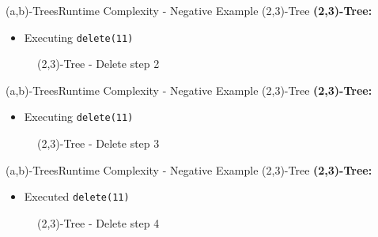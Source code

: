 
\begin{frame}{(a,b)-Trees}{Runtime Complexity - Negative Example (2,3)-Tree}
  \textbf{(2,3)-Tree:}
  \begin{itemize}
    \item
      Executing \texttt{\color{Mittel-Blau}delete(11)}
  \end{itemize}
  \begin{figure}
    \begin{adjustbox}{width=0.6\linewidth}
      
    \end{adjustbox}
    \label{fig:a_b_tree:2_3_tree_3}
    \caption{(2,3)-Tree - Delete step 2}
  \end{figure}
\end{frame}


\begin{frame}{(a,b)-Trees}{Runtime Complexity - Negative Example (2,3)-Tree}
  \textbf{(2,3)-Tree:}
  \begin{itemize}
    \item
      Executing \texttt{\color{Mittel-Blau}delete(11)}
  \end{itemize}
  \begin{figure}
    \begin{adjustbox}{width=0.6\linewidth}
      
    \end{adjustbox}
    \label{fig:a_b_tree:2_3_tree_4}
    \caption{(2,3)-Tree - Delete step 3}
  \end{figure}
\end{frame}


\begin{frame}{(a,b)-Trees}{Runtime Complexity - Negative Example (2,3)-Tree}
  \textbf{(2,3)-Tree:}
  \begin{itemize}
    \item
      Executed \texttt{\color{Mittel-Blau}delete(11)}
  \end{itemize}
  \begin{figure}
    \begin{adjustbox}{width=0.6\linewidth}
      
    \end{adjustbox}
    \label{fig:a_b_tree:2_3_tree_5}
    \caption{(2,3)-Tree - Delete step 4}
  \end{figure}
\end{frame}


